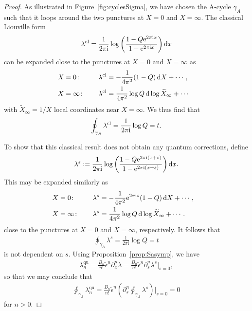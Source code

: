\documentclass[pdftex]{sigma}
\numberwithin{equation}{section}
\begin{document}
\begin{proof}
As illustrated in Figure~\ref{fig:cyclesSigma}, we have chosen the A-cycle $\gamma_A$ such that it loops around the two punctures at $X=0$ and $X=\infty$. The classical Liouville form
\begin{equation*}\lambda^\mathrm{cl} = \frac{1}{2 \pi\mathrm{i}} \log \left( \frac{1-Q{\rm e}^{2 \pi \mathrm{i} x}}{1-{\rm e}^{2 \pi \mathrm{i} x}}\right) {\rm d} x\end{equation*}
can be expanded close to the punctures at $X=0$ and $X=\infty$ as
 \begin{alignat*}{3}
 & X=0\colon \quad && \lambda^\mathrm{cl} = -\frac{1}{4 \pi^2} (1-Q) \,{\rm d} X + \cdots, &\\
 &X=\infty\colon \quad && \lambda^\mathrm{cl} = \frac{1}{4 \pi^2} \log Q \,{\rm d} \log \widetilde{X}_\infty + \cdots &
\end{alignat*}
with $\widetilde{X}_\infty = 1/X$ local coordinates near $X=\infty$. We thus find that
\begin{align*}
 \oint_{\gamma_A} \lambda^\mathrm{cl} = \frac{1}{2 \pi {\rm i}} \log Q = t.
\end{align*}

To show that this classical result does not obtain any quantum corrections, define
\begin{align*}
\lambda^s := \frac{1}{2\pi \mathrm{i}} \log \left( \frac{1-Q {\rm e}^{2 \pi \mathrm{i} (x+s)}}{1-{\rm e}^{2 \pi \mathrm{i} (x+s)}}\right) {\rm d} x.
\end{align*}
This may be expanded similarly as
\begin{alignat*}{3}
 & X=0\colon \quad && \lambda^s = -\frac{1}{4 \pi^2} {\rm e}^{2 \pi \mathrm{i} s} (1-Q) \,{\rm d} X + \cdots, & \\
& X=\infty\colon \quad && \lambda^s = \frac{1}{4\pi^2} \log Q \,{\rm d} \log \widetilde{X}_\infty + \cdots.&
\end{alignat*}
close to the punctures at $X=0$ and $X=\infty$, respectively.
It follows that
\begin{gather*}
 \oint_{\gamma_A} \lambda^s = \frac{1}{2 \pi \mathrm{i}} \log Q = t
\end{gather*}
is not dependent on $s$. Using Proposition~\eqref{prop:Sasymp}, we have
\begin{gather*}
 \lambda^{\mathrm{qu}}_n = \frac{B_n}{n!} \check{\epsilon}^n \partial_x^n \lambda
 = \frac{B_n}{n!} \check{\epsilon}^n \partial_s^n \lambda^s \big|_{s=0},
\end{gather*}
so that we may conclude that
\begin{gather*}
 \oint_{\gamma_A} \lambda^{\mathrm{qu}}_n = \frac{B_n}{n!} \check{\epsilon}^n \left( \partial_s^n \oint_{\gamma_A} \lambda^s \right)\Big|_{s=0} = 0
\end{gather*}
for $n>0$.
 \end{proof}
\end{document}
